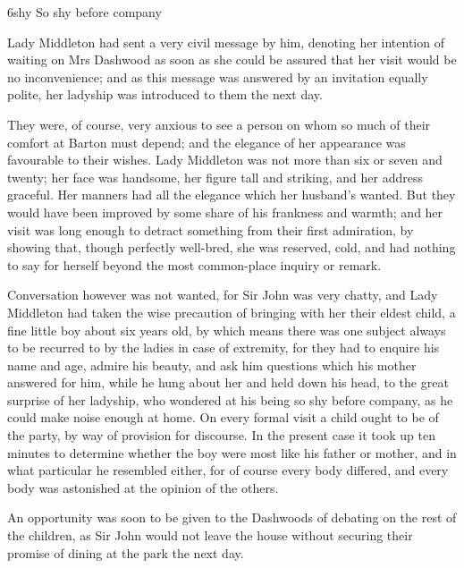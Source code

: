 
\begin{bwbigpic}
	[1.0]
	{6shy} 
	{So shy before company} 
\end{bwbigpic}

Lady Middleton had sent a very civil message by him, denoting her intention of waiting on Mrs Dashwood as soon as she could be assured that her visit would be no inconvenience; and as this message was answered by an invitation equally polite, her ladyship was introduced to them the next day.

They were, of course, very anxious to see a person on whom so much of their comfort at Barton must depend; and the elegance of her appearance was favourable to their wishes. Lady Middleton was not more than six or seven and twenty; her face was handsome, her figure tall and striking, and her address graceful. Her manners had all the elegance which her husband's wanted. But they would have been improved by some share of his frankness and warmth; and her visit was long enough to detract something from their first admiration, by showing that, though perfectly well-bred, she was reserved, cold, and had nothing to say for herself beyond the most common-place inquiry or remark.

Conversation however was not wanted, for Sir John was very chatty, and Lady Middleton had taken the wise precaution of bringing with her their eldest child, a fine little boy about six years old, by which means there was one subject always to be recurred to by the ladies in case of extremity, for they had to enquire his name and age, admire his beauty, and ask him questions which his mother answered for him, while he hung about her and held down his head, to the great surprise of her ladyship, who wondered at his being so shy before company, as he could make noise enough at home. On every formal visit a child ought to be of the party, by way of provision for discourse. In the present case it took up ten minutes to determine whether the boy were most like his father or mother, and in what particular he resembled either, for of course every body differed, and every body was astonished at the opinion of the others.

An opportunity was soon to be given to the Dashwoods of debating on the rest of the children, as Sir John would not leave the house without securing their promise of dining at the park the next day.
